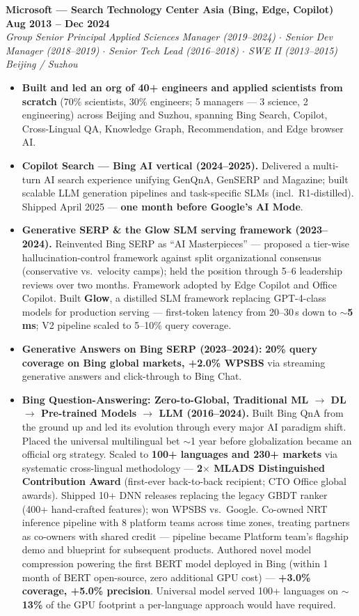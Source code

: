 \documentclass[10.5pt,letterpaper]{article}
\newcommand{\role}[4]{%
  \noindent\textbf{#1} \hfill \textbf{#3}\\
  \textit{#2} \hfill \textit{#4}\par\vspace{2pt}}
\begin{document}
\vspace{4pt}
\role{Microsoft --- Search Technology Center Asia (Bing, Edge, Copilot)}{Group Senior Principal Applied Sciences Manager (2019--2024) $\cdot$ Senior Dev Manager (2018--2019) $\cdot$ Senior Tech Lead (2016--2018) $\cdot$ SWE II (2013--2015)}{Aug 2013 -- Dec 2024}{Beijing / Suzhou}
\begin{itemize}
  \item \textbf{Built and led an org of 40+ engineers and applied scientists from scratch} (70\% scientists, 30\% engineers; 5 managers --- 3 science, 2 engineering) across Beijing and Suzhou, spanning Bing Search, Copilot, Cross-Lingual QA, Knowledge Graph, Recommendation, and Edge browser AI.
  \item \textbf{Copilot Search --- Bing AI vertical (2024--2025).} Delivered a multi-turn AI search experience unifying GenQnA, GenSERP and Magazine; built scalable LLM generation pipelines and task-specific SLMs (incl.\ R1-distilled). Shipped April 2025 --- \textbf{one month before Google's AI Mode}.
  \item \textbf{Generative SERP \& the Glow SLM serving framework (2023--2024).} Reinvented Bing SERP as ``AI Masterpieces'' --- proposed a tier-wise hallucination-control framework against split organizational consensus (conservative vs.\ velocity camps); held the position through 5--6 leadership reviews over two months. Framework adopted by Edge Copilot and Office Copilot. Built \textbf{Glow}, a distilled SLM framework replacing GPT-4-class models for production serving --- first-token latency from 20--30\,s down to \textbf{$\sim$5\,ms}; V2 pipeline scaled to 5--10\% query coverage.
  \item \textbf{Generative Answers on Bing SERP (2023--2024):} \textbf{20\% query coverage on Bing global markets, +2.0\% WPSBS} via streaming generative answers and click-through to Bing Chat.
  \item \textbf{Bing Question-Answering: Zero-to-Global, Traditional ML $\to$ DL $\to$ Pre-trained Models $\to$ LLM (2016--2024).} Built Bing QnA from the ground up and led its evolution through every major AI paradigm shift. Placed the universal multilingual bet $\sim$1 year before globalization became an official org strategy. Scaled to \textbf{100+ languages and 230+ markets} via systematic cross-lingual methodology --- \textbf{2$\times$ MLADS Distinguished Contribution Award} (first-ever back-to-back recipient; CTO Office global awards). Shipped 10+ DNN releases replacing the legacy GBDT ranker (400+ hand-crafted features); won WPSBS vs.\ Google. Co-owned NRT inference pipeline with 8 platform teams across time zones, treating partners as co-owners with shared credit --- pipeline became Platform team's flagship demo and blueprint for subsequent products. Authored novel model compression powering the first BERT model deployed in Bing (within 1 month of BERT open-source, zero additional GPU cost) --- \textbf{+3.0\% coverage, +5.0\% precision}. Universal model served 100+ languages on \textbf{$\sim$13\%} of the GPU footprint a per-language approach would have required.

\end{itemize}
\end{document}
